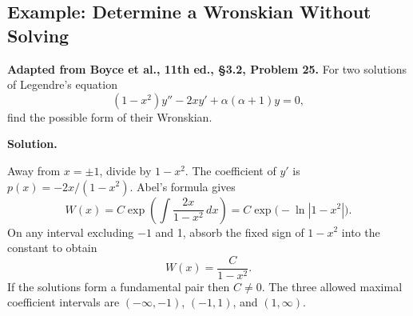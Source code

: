 \documentclass[11pt]{article}
\newenvironment{solution}
    {\par\noindent\textbf{Solution.}\par}
    {\par}
\begin{document}
\subsection{Example: Determine a Wronskian Without Solving}
\textbf{Adapted from Boyce et al., 11th ed., \S3.2, Problem 25.}
For two solutions of Legendre's equation
\[
(1-x^2)y''-2xy'+\alpha(\alpha+1)y=0,
\]
find the possible form of their Wronskian.
\begin{solution}
Away from \(x=\pm1\), divide by \(1-x^2\). The coefficient of
\(y'\) is \(p(x)=-2x/(1-x^2)\). Abel's formula gives
\[
W(x)=C\exp\left(\int\frac{2x}{1-x^2}\,dx\right)
=C\exp\bigl(-\ln|1-x^2|\bigr).
\]
On any interval excluding \(-1\) and 1, absorb the fixed sign of
\(1-x^2\) into the constant to obtain
\[
\boxed{W(x)=\frac{C}{1-x^2}.}
\]
If the solutions form a fundamental pair then \(C\ne0\). The three
allowed maximal coefficient intervals are
\(( -\infty,-1)\), \((-1,1)\), and \((1,\infty)\).
\end{solution}
\end{document}
